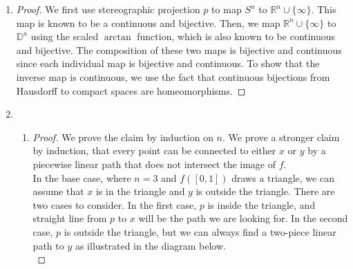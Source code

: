 \documentclass{article}
\begin{document}
\begin{enumerate}
\begin{enumerate}
\begin{proof}
          Consider the distinct points $[(-1,0)]$ and $[(1,0)]$ in
          $X/\sim$. Let $\bar{U}$ and $\bar{V}$ be open sets covering the
          distinct points respectively. Without loss of generality, we can
          assume that the inverse quotient image $U=\pi^{-1}(\bar(U))$ and
          $V=\pi^{-1}(\bar(V))$ of these open sets include the balls
          $B_{r}((-1,0))$ and $B_{r}((-1,0))$ respectively, where $r<1$.
          Hence, $U$ and $V$ include the points $(-1+r/2,0)$ and $(1-r/2,0)$
          respectively. However, these two points belong to the same
          equivalence class and are therefore the same point in the
          quotient space, which implies that $\bar{U}$ and $\bar{V}$ cannot
          be disjoint in the quotient space.
        \end{proof}
    \end{enumerate}
  \item
    \begin{proof}
      We first use stereographic projection $p$ to map $S^n$ to
      $\mathbb{R}^n\cup\{\infty\}$. This map is known to be a continuous
      and bijective. Then, we map $\mathbb{R}^n\cup\{\infty\}$ to
      $\mathbb{D}^n$ using the scaled $\arctan$ function, which is also
      known to be continuous and bijective. The composition of these two
      maps is bijective and continuous since each individual map is
      bijective and continuous. To show that the inverse map is continuous,
      we use the fact that continuous bijections from Hausdorff to compact
      spaces are homeomorphisms.
    \end{proof}
  \item
    \begin{enumerate}
      \item
        \begin{proof}
          We prove the claim by induction on $n$. We prove a stronger
          claim by induction, that every point can be connected to either
          $x$ or $y$ by a piecewise linear path that does not intersect the
          image of $f$. \\

          In the base case, where $n=3$ and $f([0,1])$ draws a triangle, we
          can assume that $x$ is in the triangle and $y$ is outside the
          triangle. There are two cases to consider. In the first case, $p$
          is inside the triangle, and straight line from $p$ to $x$ will be
          the path we are looking for. In the second case, $p$ is outside
          the triangle, but we can always find a two-piece linear path to
          $y$ as illustrated in the diagram below. \\


\end{proof}
\end{enumerate}
\end{enumerate}
\end{document}

